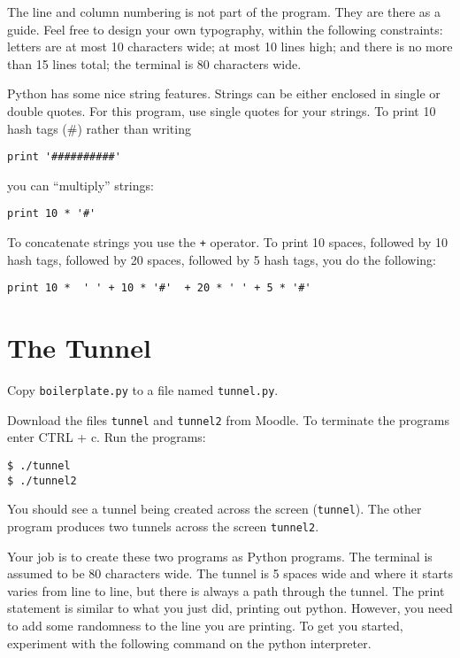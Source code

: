 \documentclass[12pt]{article}
\begin{document}
The line and column numbering is not part of the program. They are there as a guide. Feel free to design your own typography, within the following constraints: letters are at most 10 characters wide; at most 10 lines high; and there is no more than 15 lines total; the terminal is 80 characters wide.

Python has some nice string features. Strings can be either enclosed in single or double quotes. For this program, use single quotes for your strings. To print 10 hash tags (\#) rather than writing

\begin{lstlisting}[style=c]
print '##########'
\end{lstlisting}
 
you can ``multiply'' strings:

\begin{lstlisting}[style=c]
print 10 * '#' 
\end{lstlisting}

To concatenate strings you use the \texttt{+} operator. To print 10 spaces, followed by 10 hash tags, followed by 20 spaces, followed by 5 hash tags, you do the following:

\begin{lstlisting}[style=c]
print 10 *  ' ' + 10 * '#'  + 20 * ' ' + 5 * '#'
\end{lstlisting}

\section{The Tunnel}

Copy \texttt{boilerplate.py} to a file named \texttt{tunnel.py}. 

Download the files \texttt{tunnel} and \texttt{tunnel2} from Moodle. To terminate the programs enter CTRL + c. Run the programs:

\begin{lstlisting}[style=c]
$ ./tunnel
$ ./tunnel2
\end{lstlisting}

You should see a tunnel being created across the screen (\texttt{tunnel}). The other program produces two tunnels across the screen \texttt{tunnel2}.

Your job is to create these two programs as Python programs. The terminal is assumed to be 80 characters wide. The tunnel is 5 spaces wide and where it starts varies from line to line, but there is always a path through the tunnel. The print statement is similar to what you just did, printing out python. However, you need to add some randomness to the line you are printing. To get you started, experiment with the following command on the python interpreter. 
\end{document}
